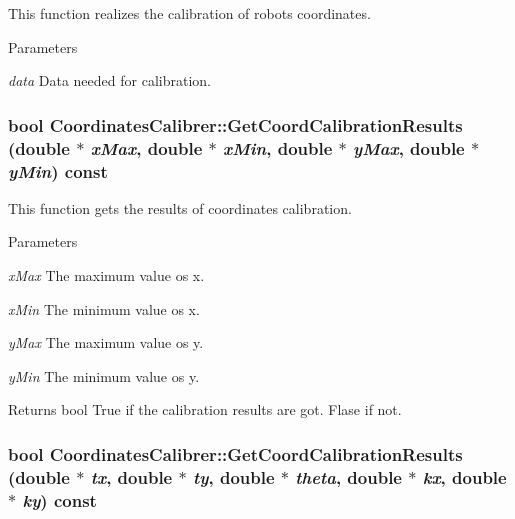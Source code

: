 This function realizes the calibration of robots coordinates. 


\begin{DoxyParams}{Parameters}
\item[{\em data}]Data needed for calibration. \end{DoxyParams}
\hypertarget{classCoordinatesCalibrer_a1a3ae703556c2f4c4455792a43fed987}{
\subsubsection[{GetCoordCalibrationResults}]{\setlength{\rightskip}{0pt plus 5cm}bool CoordinatesCalibrer::GetCoordCalibrationResults (double $\ast$ {\em xMax}, \/  double $\ast$ {\em xMin}, \/  double $\ast$ {\em yMax}, \/  double $\ast$ {\em yMin}) const}}
\label{classCoordinatesCalibrer_a1a3ae703556c2f4c4455792a43fed987}


This function gets the results of coordinates calibration. 


\begin{DoxyParams}{Parameters}
\item[{\em xMax}]The maximum value os x. \item[{\em xMin}]The minimum value os x. \item[{\em yMax}]The maximum value os y. \item[{\em yMin}]The minimum value os y. \end{DoxyParams}
\begin{DoxyReturn}{Returns}
bool True if the calibration results are got. Flase if not. 
\end{DoxyReturn}
\hypertarget{classCoordinatesCalibrer_a92672252bda26bddd9b8c73bc6395ea3}{
\subsubsection[{GetCoordCalibrationResults}]{\setlength{\rightskip}{0pt plus 5cm}bool CoordinatesCalibrer::GetCoordCalibrationResults (double $\ast$ {\em tx}, \/  double $\ast$ {\em ty}, \/  double $\ast$ {\em theta}, \/  double $\ast$ {\em kx}, \/  double $\ast$ {\em ky}) const}}
\label{classCoordinatesCalibrer_a92672252bda26bddd9b8c73bc6395ea3}



